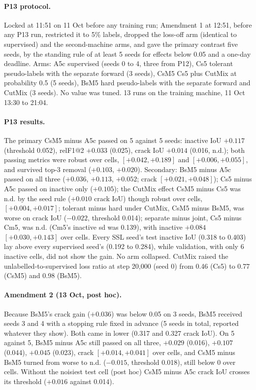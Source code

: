 \paragraph{P13 protocol.} Locked at 11:51 on 11 Oct before any training run; Amendment 1 at 12:51, before any P13 run, restricted it
to 5\% labels, dropped the loss-off arm (identical to supervised) and the second-machine arms, and gave the primary contrast five
seeds, by the standing rule of at least 5 seeds for effects below 0.05 and a one-day deadline. Arms: A5c supervised (seeds 0 to 4,
three from P12), Cs5 tolerant pseudo-labels with the separate forward (3 seeds), CsM5 Cs5 plus CutMix at probability 0.5 (5 seeds),
BsM5 hard pseudo-labels with the separate forward and CutMix (3 seeds). No value was tuned. 13 runs on the training machine, 11 Oct
13:30 to 21:04.

\paragraph{P13 results.} The primary CsM5 minus A5c passed on 5 against 5 seeds: inactive IoU $+0.117$ (threshold 0.052), relF1@2
$+0.033$ (0.025), crack IoU $+0.014$ (0.016, n.d.); both passing metrics were robust over cells, $[+0.042, +0.189]$ and
$[+0.006, +0.055]$, and survived top-3 removal ($+0.103$, $+0.020$). Secondary: BsM5 minus A5c passed on all three ($+0.036$, $+0.113$,
$+0.052$; crack $[+0.021, +0.048]$); Cs5 minus A5c passed on inactive only ($+0.105$); the CutMix effect CsM5 minus Cs5 was n.d. by the
seed rule ($+0.010$ crack IoU) though robust over cells, $[+0.004, +0.017]$; tolerant minus hard under CutMix, CsM5 minus BsM5, was
worse on crack IoU ($-0.022$, threshold 0.014); separate minus joint, Cs5 minus Cm5, was n.d. (Cm5's inactive sd was 0.139), with
inactive $+0.084$ $[+0.030, +0.143]$ over cells. Every SSL seed's test inactive IoU (0.318 to 0.403) lay above every supervised
seed's (0.192 to 0.284), while validation, with only 6 inactive cells, did not show the gain. No arm collapsed. CutMix raised the
unlabelled-to-supervised loss ratio at step 20,000 (seed 0) from 0.46 (Cs5) to 0.77 (CsM5) and 0.98 (BsM5).

\paragraph{Amendment 2 (13 Oct, post hoc).} Because BsM5's crack gain ($+0.036$) was below 0.05 on 3 seeds, BsM5 received seeds 3
and 4 with a stopping rule fixed in advance (5 seeds in total, reported whatever they show). Both came in lower (0.317 and 0.327
crack IoU). On 5 against 5, BsM5 minus A5c still passed on all three, $+0.029$ (0.016), $+0.107$ (0.044), $+0.045$ (0.023), crack
$[+0.014, +0.041]$ over cells, and CsM5 minus BsM5 turned from worse to n.d. ($-0.015$, threshold 0.018), still below 0 over cells.
Without the noisiest test cell (post hoc) CsM5 minus A5c crack IoU crosses its threshold ($+0.016$ against 0.014).

